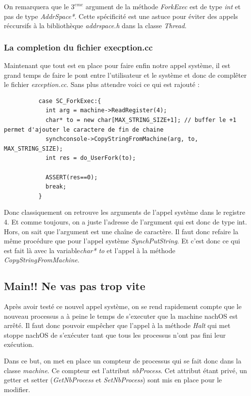 \documentclass[a4paper,10pt]{article}
\begin{document}
  On remarquera que le $3^{eme}$ argument de la méthode \emph{ForkExec} est de type \emph{int} et pas de type \emph{AddrSpace*}. Cette spécificité est une 
  astuce pour éviter des appels réccursifs à la bibliothèque \emph{addrspace.h} dans la classe \emph{Thread}.
  
  \textcolor{TealBlue}{\subsubsection*{La completion du fichier execption.cc}}
  Maintenant que tout est en place pour faire enfin notre appel système, il est grand temps de faire le pont entre l'utilisateur et le système et donc
  de complêter le fichier \emph{exception.cc}. Sans plus attendre voici ce qui est rajouté : 
  \begin{lstlisting}
          case SC_ForkExec:{
            int arg = machine->ReadRegister(4);
            char* to = new char[MAX_STRING_SIZE+1]; // buffer le +1 permet d'ajouter le caractere de fin de chaine
            synchconsole->CopyStringFromMachine(arg, to, MAX_STRING_SIZE);
            int res = do_UserFork(to);

            ASSERT(res==0);
            break;
          }   
  \end{lstlisting}
  Donc classiquement on retrouve les arguments de l'appel système dans le registre 4. Et comme toujours, on a juste l'adresse de l'argument qui est donc
  de type int. Hors, on sait que l'argument est une chaîne de caractère. Il faut donc refaire la même procédure que pour l'appel 
  système \emph{SynchPutString}. Et c'est donc ce qui est fait là avec la variable\emph{char* to} et l'appel à la méthode \emph{CopyStringFromMachine}.
  
  \newpage
  \textcolor{NavyBlue}{\subsection{Main!! Ne vas pas trop vite}}
  Après avoir testé ce nouvel appel système, on se rend rapidement compte que le nouveau processus a à peine le temps de s'executer que la machine nachOS
  est arrêté. Il faut donc pouvoir empêcher que l'appel à la méthode \emph{Halt} qui met stoppe nachOS de s'exécuter tant que tous les processus n'ont pas
  fini leur exécution.
  
  Dans ce but, on met en place un compteur de processus qui se fait donc dans la classe \emph{machine}. Ce compteur est l'attribut \emph{nbProcess}. Cet
  attribut étant privé, un getter et setter (\emph{GetNbProcess} et \emph{SetNbProcess}) sont mis en place pour le modifier.
  
\end{document}
